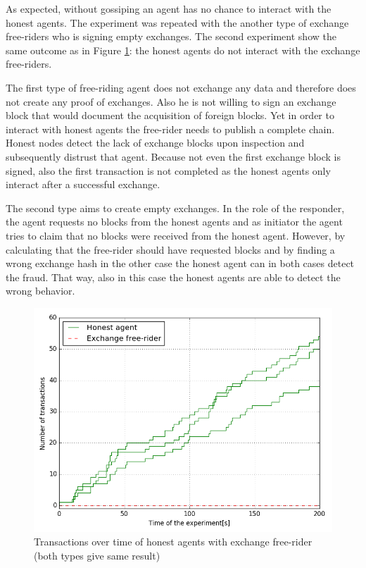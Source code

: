 As expected, without gossiping an agent has no chance to interact with the honest agents. The 
experiment was repeated with the another type of exchange free-riders who is signing empty exchanges. 
The second experiment show the same outcome as in Figure \ref{fig:DFR_no_exchanges}:
the honest agents do not interact with the exchange free-riders.

The first type of free-riding agent does not exchange any data and therefore does not create any 
proof of exchanges. Also he is not willing to sign an exchange block that would document the acquisition
of foreign blocks. Yet in order to interact with honest agents the free-rider needs 
to publish a complete chain. Honest nodes detect the lack of exchange blocks upon inspection and 
subsequently distrust that agent. Because not even the first exchange block is signed, also the first
transaction is not completed as the honest agents only interact after a successful exchange.

The second type aims to create empty exchanges. In the role of the responder, the agent requests no 
blocks from the honest agents and as initiator the agent tries to claim that no blocks were received 
from the honest agent. However, by calculating 
that the free-rider should have requested blocks and by finding a wrong exchange hash in the other case
the honest agent can in both cases detect the fraud. That way, also in this case the honest agents 
are able to detect the wrong behavior.

\begin{figure}
  \centering
  \includegraphics[width=.6\linewidth]{images/gossip_free-rider}
  \caption{Transactions over time of honest agents with exchange free-rider (both types give same result)}
  \label{fig:DFR_no_exchanges}
\end{figure}



